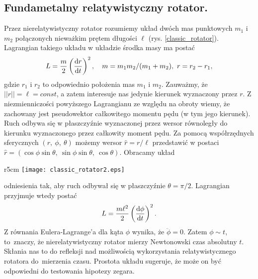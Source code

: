 \subsection{Fundametalny relatywistyczny rotator.}
Przez nierelatywistyczny rotator rozumiemy układ dwóch mas punktowych
$m_1$ i $m_2$ połączonych nieważkim
prętem długości $\ell$ (rys. \ref{classic_rotator}). Lagrangian 
takiego układu w układzie środka masy ma postać~\cite{landau1978krotki}
\begin{align*}
L = \frac{m }{2} \left(\frac{\text{d} r}{\text{d} t}\right)^2, 
\quad m=m_1 m_2/(m_1+m_2),\ r=r_2-r_1,
\end{align*}
gdzie $r_1$ i $r_2$ to odpowiednio położenia mas $m_1$ i $m_2$.
Zauważmy, że $||r|| =\ell = const$, a zatem interesuje nas jedynie kierunek 
wyznaczony przez $r$.
Z niezmienniczości powyższego Lagrangianu ze względu na obroty wiemy, że
 zachowany jest pseudowektor całkowitego
momentu pędu (w tym jego kierunek). Ruch
odbywa się w płaszczyźnie wyznaczonej przez 
wersor równoległy do kierunku wyznaczonego 
przez całkowity moment pędu.
 Za pomocą  współrzędnych sferycznych $(r,\ \phi,\ \theta)$ 
możemy wersor $ \hat{r} = r / \ell$  przedstawić w postaci
 $\hat{r} = ( \cos \phi \sin\theta, \ \sin\phi\sin\theta,\ \cos\theta )$.
Obracamy układ 
\begin{wrapfigure}[8]{r}{5cm}
\centering
\texttt{[image: classic\_rotator2.eps]}
\caption{Klasyczny rotator.
}
\label{classic_rotator}
\end{wrapfigure}
odniesienia tak, aby ruch odbywał się w
 płaszczyźnie $\theta = \pi/2$. 
Lagrangian 
przyjmuje wtedy postać
\begin{align*}
L = \frac{m\ell^2 }{2} \left(\frac{\text{d} \phi}{\text{d} t}\right)^2.
\end{align*}
Z równania Eulera-Lagrange'a dla kąta $\phi$ wynika, że 
$\ddot{\phi} = 0.$
Zatem $\phi \sim t$, to~znaczy, że
nierelatywistyczny rotator mierzy Newtonowski czas
absolutny $t$. Skłania nas to do refleksji nad możliwością 
wykorzystania relatywistycznego rotatora 
do~mierzenia czasu. Prostota układu sugeruje, że 
może on być odpowiedni do testowania hipotezy zegara.

